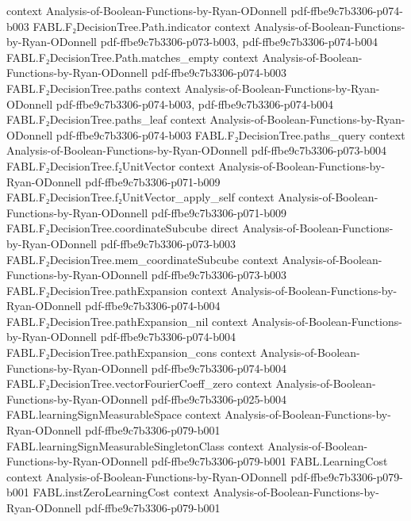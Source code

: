 \begin{theorem}
  {context}
  {Analysis-of-Boolean-Functions-by-Ryan-ODonnell}
  {pdf-ffbe9c7b3306-p074-b003}
\proofstep
  {FABL.F₂DecisionTree.Path.indicator}
  {context}
  {Analysis-of-Boolean-Functions-by-Ryan-ODonnell}
  {pdf-ffbe9c7b3306-p073-b003,
    pdf-ffbe9c7b3306-p074-b004}
\proofstep
  {FABL.F₂DecisionTree.Path.matches_empty}
  {context}
  {Analysis-of-Boolean-Functions-by-Ryan-ODonnell}
  {pdf-ffbe9c7b3306-p074-b003}
\proofstep
  {FABL.F₂DecisionTree.paths}
  {context}
  {Analysis-of-Boolean-Functions-by-Ryan-ODonnell}
  {pdf-ffbe9c7b3306-p074-b003,
    pdf-ffbe9c7b3306-p074-b004}
\proofstep
  {FABL.F₂DecisionTree.paths_leaf}
  {context}
  {Analysis-of-Boolean-Functions-by-Ryan-ODonnell}
  {pdf-ffbe9c7b3306-p074-b003}
\proofstep
  {FABL.F₂DecisionTree.paths_query}
  {context}
  {Analysis-of-Boolean-Functions-by-Ryan-ODonnell}
  {pdf-ffbe9c7b3306-p073-b004}
\proofstep
  {FABL.F₂DecisionTree.f₂UnitVector}
  {context}
  {Analysis-of-Boolean-Functions-by-Ryan-ODonnell}
  {pdf-ffbe9c7b3306-p071-b009}
\proofstep
  {FABL.F₂DecisionTree.f₂UnitVector_apply_self}
  {context}
  {Analysis-of-Boolean-Functions-by-Ryan-ODonnell}
  {pdf-ffbe9c7b3306-p071-b009}
\proofstep
  {FABL.F₂DecisionTree.coordinateSubcube}
  {direct}
  {Analysis-of-Boolean-Functions-by-Ryan-ODonnell}
  {pdf-ffbe9c7b3306-p073-b003}
\proofstep
  {FABL.F₂DecisionTree.mem_coordinateSubcube}
  {context}
  {Analysis-of-Boolean-Functions-by-Ryan-ODonnell}
  {pdf-ffbe9c7b3306-p073-b003}
\proofstep
  {FABL.F₂DecisionTree.pathExpansion}
  {context}
  {Analysis-of-Boolean-Functions-by-Ryan-ODonnell}
  {pdf-ffbe9c7b3306-p074-b004}
\proofstep
  {FABL.F₂DecisionTree.pathExpansion_nil}
  {context}
  {Analysis-of-Boolean-Functions-by-Ryan-ODonnell}
  {pdf-ffbe9c7b3306-p074-b004}
\proofstep
  {FABL.F₂DecisionTree.pathExpansion_cons}
  {context}
  {Analysis-of-Boolean-Functions-by-Ryan-ODonnell}
  {pdf-ffbe9c7b3306-p074-b004}
\proofstep
  {FABL.F₂DecisionTree.vectorFourierCoeff_zero}
  {context}
  {Analysis-of-Boolean-Functions-by-Ryan-ODonnell}
  {pdf-ffbe9c7b3306-p025-b004}
\proofstep
  {FABL.learningSignMeasurableSpace}
  {context}
  {Analysis-of-Boolean-Functions-by-Ryan-ODonnell}
  {pdf-ffbe9c7b3306-p079-b001}
\proofstep
  {FABL.learningSignMeasurableSingletonClass}
  {context}
  {Analysis-of-Boolean-Functions-by-Ryan-ODonnell}
  {pdf-ffbe9c7b3306-p079-b001}
\proofstep
  {FABL.LearningCost}
  {context}
  {Analysis-of-Boolean-Functions-by-Ryan-ODonnell}
  {pdf-ffbe9c7b3306-p079-b001}
\proofstep
  {FABL.instZeroLearningCost}
  {context}
  {Analysis-of-Boolean-Functions-by-Ryan-ODonnell}
  {pdf-ffbe9c7b3306-p079-b001}

\end{theorem}
